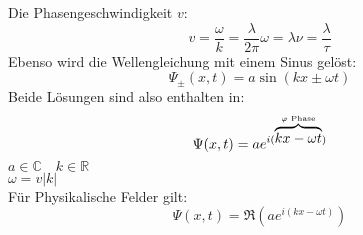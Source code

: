 Die Phasengeschwindigkeit $ v $:
\begin{equation*}
v = \frac{\omega}{k} = \frac{\lambda}{2 \pi} \omega = \lambda \nu = \frac{\lambda}{\tau}
\end{equation*}
Ebenso wird die Wellengleichung mit einem Sinus gelöst:
\begin{equation*}
\Psi_{\pm} (x,t) = a \sin(kx \pm \omega t)
\end{equation*}
Beide Lösungen sind also enthalten in:
\begin{equation*}
\Psi(x,t) = a e^{i(\overbrace{kx - \omega t}^{\varphi \textrm{ Phase}})}
\end{equation*}
$ a \in \mathbb{C} \quad k \in \mathbb{R} $\\
$ \omega = v |k| $\\
Für Physikalische Felder gilt:
\begin{equation*}
\Psi(x,t) = \Re\left(a e^{i(kx - \omega t)}\right)
\end{equation*}

